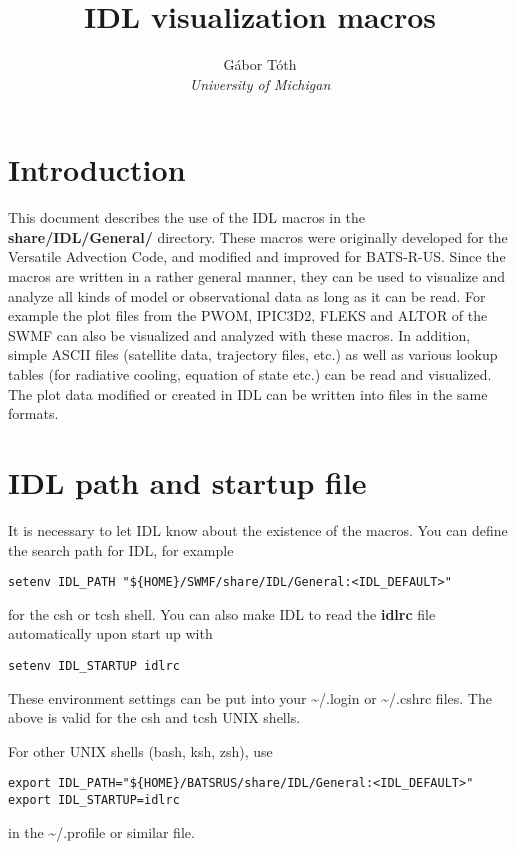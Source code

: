 \documentclass{article}
\title{IDL visualization macros}
\author{G\'abor T\'oth\\{\it University of Michigan}}
\newcommand{\BATSRUS}{BATS-R-US}
\begin{document}
\maketitle

\newpage

\tableofcontents

\newpage

\section{Introduction}

This document describes the use of the IDL macros 
in the {\bf share/IDL/General/} directory.
These macros were originally developed for the Versatile Advection Code,
and modified and improved for \BATSRUS. Since the macros are written
in a rather general manner, they can be used to visualize and analyze all kinds
of model or observational data as long as it can be read. For example
the plot files from the PWOM, IPIC3D2, FLEKS and ALTOR
of the SWMF can also be visualized and analyzed with these macros.
In addition, simple ASCII files (satellite data, trajectory files, etc.)
as well as various lookup tables (for radiative cooling, equation of state etc.)
can be read and visualized. The plot data modified or created in IDL 
can be written into files in the same formats.

\section{IDL path and startup file \label{s-idl-path}}

It is necessary to let IDL know about the existence of the macros.  
You can define the search path for IDL, for example
\begin{verbatim}
setenv IDL_PATH "${HOME}/SWMF/share/IDL/General:<IDL_DEFAULT>"
\end{verbatim}
for the csh or tcsh shell. You can also make IDL to read 
the {\bf idlrc} file automatically upon start up with
\begin{verbatim}
setenv IDL_STARTUP idlrc
\end{verbatim}
These environment settings can be put into your \~{}/.login or \~{}/.cshrc 
files. The above is valid for the csh and tcsh UNIX shells. 

For other UNIX shells (bash, ksh, zsh), use
\begin{verbatim}
export IDL_PATH="${HOME}/BATSRUS/share/IDL/General:<IDL_DEFAULT>"
export IDL_STARTUP=idlrc
\end{verbatim}
in the \~{}/.profile or similar file.
\end{document}
